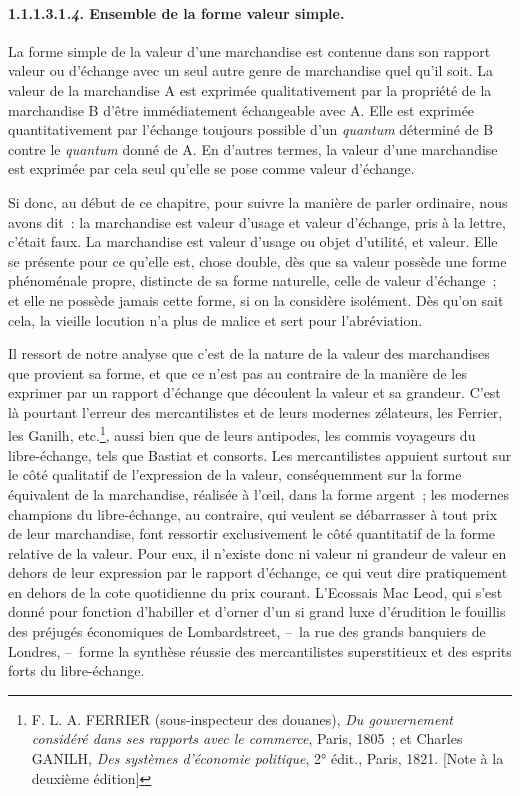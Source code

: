 \documentclass[french,twoside]{book} %
\begin{document}
\paragraph[{1.1.1.3.1.4. Ensemble de la forme valeur simple.}]{1.1.1.3.1\emph{.4}. Ensemble de la forme valeur simple.}
\noindent La forme simple de la valeur d’une marchandise est contenue dans son rapport valeur ou d’échange avec un seul autre genre de marchandise quel qu’il soit. La valeur de la marchandise A est exprimée qualitativement par la propriété de la marchandise B d’être immédiatement échangeable avec A. Elle est exprimée quantitativement par l’échange toujours possible d’un \emph{quantum} déterminé de B contre le \emph{quantum} donné de A. En d’autres termes, la valeur d’une marchandise est exprimée par cela seul qu’elle se pose comme valeur d’échange.\par
Si donc, au début de ce chapitre, pour suivre la manière de parler ordinaire, nous avons dit : la marchandise est valeur d’usage et valeur d’échange, pris à la lettre, c’était faux. La marchandise est valeur d’usage ou objet d’utilité, et valeur. Elle se présente pour ce qu’elle est, chose double, dès que sa valeur possède une forme phénoménale propre, distincte de sa forme naturelle, celle de valeur d’échange ; et elle ne possède jamais cette forme, si on la considère isolément. Dès qu’on sait cela, la vieille locution n’a plus de malice et sert pour l’abréviation.\par
Il ressort de notre analyse que c’est de la nature de la valeur des marchandises que provient sa forme, et que ce n’est pas au contraire de la manière de les exprimer par un rapport d’échange que découlent la valeur et sa grandeur. C’est là pourtant l’erreur des mercantilistes et de leurs modernes zélateurs, les Ferrier, les Ganilh, etc.\footnote{F. L. A. FERRIER (sous-inspecteur des douanes), \emph{Du gouvernement considéré dans ses rapports avec le commerce}, Paris, 1805 ; et Charles GANILH, \emph{Des systèmes d’économie politique}, 2° édit., Paris, 1821. [Note à la deuxième édition]}, aussi bien que de leurs antipodes, les commis voyageurs du libre-échange, tels que Bastiat et consorts. Les mercantilistes appuient surtout sur le côté qualitatif de l’expression de la valeur, conséquemment sur la forme équivalent de la marchandise, réalisée à l’œil, dans la forme argent ; les modernes champions du libre-échange, au contraire, qui veulent se débarrasser à tout prix de leur marchandise, font ressortir exclusivement le côté quantitatif de la forme relative de la valeur. Pour eux, il n’existe donc ni valeur ni grandeur de valeur en dehors de leur expression par le rapport d’échange, ce qui veut dire pratiquement en dehors de la cote quotidienne du prix courant. L’Ecossais Mac Leod, qui s’est donné pour fonction d’habiller et d’orner d’un si grand luxe d’érudition le fouillis des préjugés économiques de Lombardstreet, – la rue des grands banquiers de Londres, – forme la synthèse réussie des mercantilistes superstitieux et des esprits forts du libre-échange.\par
\end{document}
